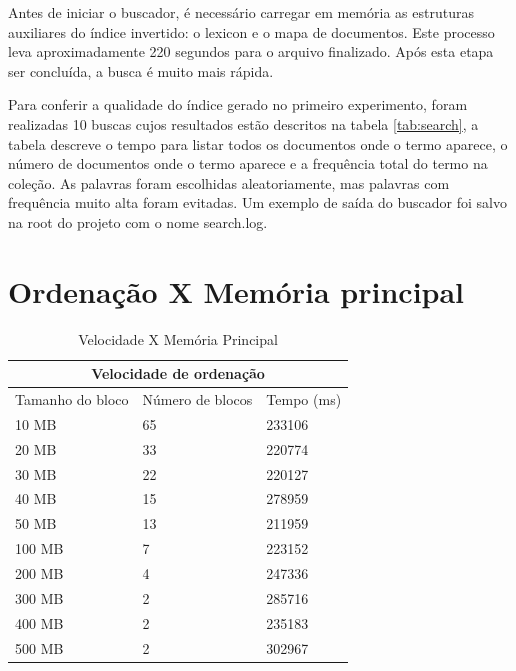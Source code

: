 \documentclass{report}
\begin{document}
Antes de iniciar o buscador, é necessário carregar em memória as estruturas auxiliares do índice invertido: o lexicon e o mapa de documentos. Este processo
leva aproximadamente 220 segundos para o arquivo finalizado. Após esta etapa ser concluída, a busca é muito mais rápida.

Para conferir a qualidade do índice gerado no primeiro experimento, foram realizadas 10 buscas cujos resultados estão descritos
na tabela \ref{tab:search}, a tabela descreve o tempo para listar todos os documentos onde o termo aparece, o número de documentos onde o termo
aparece e a frequência total do termo na coleção. As palavras foram escolhidas aleatoriamente, mas palavras com frequência muito alta foram evitadas. Um exemplo
de saída do buscador foi salvo na root do projeto com o nome search.log.

\section{Ordenação X Memória principal}

\begin{table}
\centering
\begin{tabular}{ |l|l|l| }
  \hline
  \multicolumn{3}{|c|}{Velocidade de ordenação} \\
  \hline
  Tamanho do bloco & Número de blocos & Tempo (ms) \\
  \hline                             
  10 MB            & 65               & 233106 \\
  20 MB            & 33               & 220774 \\
  30 MB            & 22               & 220127 \\               
  40 MB            & 15               & 278959 \\               
  50 MB            & 13               & 211959 \\              
  100 MB           & 7                & 223152 \\               
  200 MB           & 4                & 247336 \\               
  300 MB           & 2                & 285716 \\               
  400 MB           & 2                & 235183 \\
  500 MB           & 2                & 302967 \\               
  \hline
\end{tabular}
\caption{Velocidade X Memória Principal}
\label{tab:sorter}
\end{table}
\end{document}
